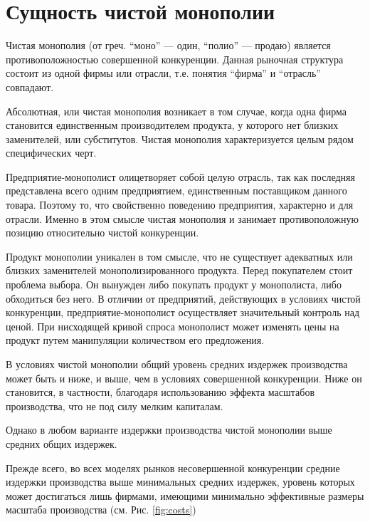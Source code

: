 \documentclass[12pt]{article}
\begin{document}
    \newpage

    \pagestyle{plain}
    \setcounter{page}{1}

    \section*{Сущность чистой монополии}

    Чистая монополия (от греч. ``моно'' --- один, ``полио'' --- продаю) является противоположностью совершенной конкуренции. Данная рыночная структура состоит из одной фирмы или отрасли, т.е. понятия ``фирма'' и ``отрасль'' совпадают.

    Абсолютная, или чистая монополия возникает в том случае, когда одна фирма становится единственным производителем продукта, у которого нет близких заменителей, или субститутов. Чистая монополия характеризуется целым рядом специфических черт.

    Предприятие-монополист олицетворяет собой целую отрасль, так как последняя представлена всего одним предприятием, единственным поставщиком данного товара. Поэтому то, что свойственно поведению предприятия, характерно и для отрасли. Именно в этом смысле чистая монополия и занимает противоположную позицию относительно чистой конкуренции.

    Продукт монополии уникален в том смысле, что не существует адекватных или близких заменителей монополизированного продукта. Перед покупателем стоит проблема выбора. Он вынужден либо покупать продукт у монополиста, либо обходиться без него. В отличии от предприятий, действующих в условиях чистой конкуренции, предприятие-монополист осуществляет значительный контроль над ценой. При нисходящей кривой спроса монополист может изменять цены на продукт путем манипуляции количеством его предложения.

    В условиях чистой монополии общий уровень средних издержек производства может быть и ниже, и выше, чем в условиях совершенной конкуренции. Ниже он становится, в частности, благодаря использованию эффекта масштабов производства, что не под силу мелким капиталам.

    Однако в любом варианте издержки производства чистой монополии выше средних общих издержек.

    Прежде всего, во всех моделях рынков несовершенной конкуренции средние издержки производства выше минимальных средних издержек, уровень которых может достигаться лишь фирмами, имеющими минимально эффективные размеры масштаба производства (см. Рис. \ref{fig:costs})
\end{document}
